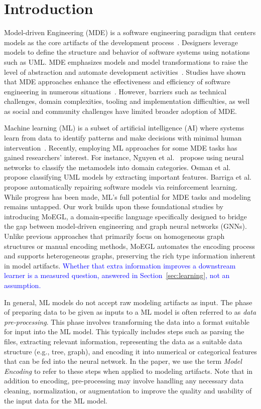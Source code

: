 \documentclass[journal,article,submit,moreauthors,technologies]{Definitions/mdpi}
\newcommand{\rev}[1]{\textcolor{blue}{#1}}
\begin{document}
\section{Introduction}\label{sec1}
Model-driven Engineering (MDE) is a software engineering paradigm that centers models as the core artifacts of the development process~\cite{brambilla2017model}. Designers leverage models to define the structure and behavior of software systems using notations such as UML. MDE emphasizes models and model transformations to raise the level of abstraction and automate development activities~\cite{mellor2003guest}. Studies have shown that MDE approaches enhance the effectiveness and efficiency of software engineering in numerous situations~\cite{whittle2013state}. However, barriers such as technical challenges, domain complexities, tooling and implementation difficulties, as well as social and community challenges have limited broader adoption of MDE.

Machine learning (ML) is a subset of artificial intelligence (AI) where systems learn from data to identify patterns and make decisions with minimal human intervention~\cite{panat2023introduction}. Recently, employing ML approaches for some MDE tasks has gained researchers' interest. For instance, Nguyen et al.~\cite{nguyen2019automated} propose using neural networks to classify the metamodels into domain categories. Osman et al.~\cite{osman2018automated} propose classifying UML models by extracting important features. Barriga et al.~\cite{barriga2019personalized} propose automatically repairing software models via reinforcement learning. While progress has been made, ML's full potential for MDE tasks and modeling remains untapped. Our work builds upon these foundational studies by introducing MoEGL, a domain-specific language specifically designed to bridge the gap between model-driven engineering and graph neural networks (GNNs). Unlike previous approaches that primarily focus on homogeneous graph structures or manual encoding methods, MoEGL automates the encoding process and supports heterogeneous graphs, preserving the rich type information inherent in model artifacts. \rev{Whether that extra information improves a downstream learner is a measured question, answered in Section~\ref{sec:learning}, not an assumption.}

In general, ML models do not accept raw modeling artifacts as input. The phase of preparing data to be given as inputs to a ML model is often referred to as \emph{data pre-processing}. This phase involves transforming the data into a format suitable for input into the ML model. This typically includes steps such as parsing the files, extracting relevant information, representing the data as a suitable data structure (e.g., tree, graph), and encoding it into numerical or categorical features that can be fed into the neural network. In the paper, we use the term \emph{Model Encoding} to refer to these steps when applied to modeling artifacts. Note that in addition to encoding, pre-processing may involve handling any necessary data cleaning, normalization, or augmentation to improve the quality and usability of the input data for the ML model.
\end{document}
